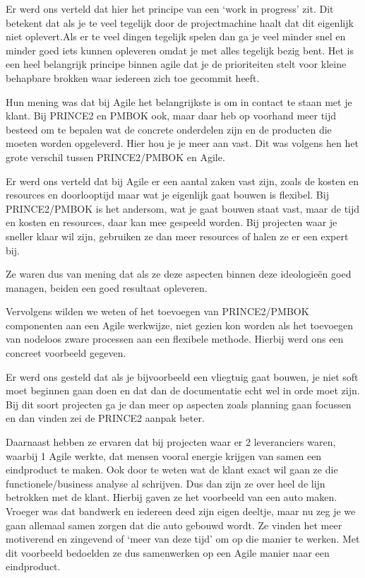 \documentclass[dutch]{hogent-article}
\begin{document}
Er werd ons verteld dat hier het principe van een ‘work in progress’ zit. Dit betekent dat als je te veel tegelijk door de projectmachine haalt dat dit eigenlijk niet oplevert.Als er te veel dingen tegelijk spelen dan ga je veel minder snel en minder goed iets kunnen opleveren omdat je met alles tegelijk bezig bent. Het is een heel belangrijk principe binnen agile dat je de prioriteiten stelt voor kleine behapbare brokken waar iedereen zich toe gecommit heeft. 
\newline

Hun mening was dat bij Agile het belangrijkste is om in contact te  staan met je klant. Bij PRINCE2 en PMBOK ook, maar daar heb op voorhand meer tijd besteed om te bepalen wat de concrete onderdelen zijn en de producten die moeten worden opgeleverd. Hier hou je je meer aan vast. Dit was volgens hen het grote verschil tussen PRINCE2/PMBOK en Agile. 
\newline

Er werd ons verteld dat bij Agile er een aantal zaken vast zijn, zoals de kosten en resources en doorlooptijd maar wat je eigenlijk gaat bouwen is flexibel. Bij PRINCE2/PMBOK is het andersom, wat je gaat bouwen staat vast, maar de tijd en kosten en resources, daar kan mee gespeeld worden. Bij projecten waar je sneller klaar wil zijn, gebruiken ze dan meer resources of halen ze er een expert bij.
\newline

Ze waren dus van mening dat als ze deze aspecten binnen deze ideologieën goed managen, beiden een goed resultaat opleveren. 
\newline

Vervolgens wilden we weten of het toevoegen van PRINCE2/PMBOK componenten aan een Agile werkwijze, niet gezien kon worden als het toevoegen van nodeloos zware processen aan een flexibele methode.  Hierbij werd ons een concreet voorbeeld gegeven. 
\newline

Er werd ons gesteld dat als je bijvoorbeeld een vliegtuig gaat bouwen, je niet soft moet beginnen gaan doen en dat dan de documentatie echt wel in orde moet zijn. Bij dit soort projecten ga je dan meer op aspecten zoals planning gaan focussen en dan vinden zei de PRINCE2 aanpak beter. 
\newline

Daarnaast hebben ze ervaren dat bij projecten waar er 2 leveranciers waren, waarbij 1 Agile werkte, dat mensen vooral energie krijgen van samen een eindproduct te maken. Ook door te weten wat de klant exact wil gaan ze die functionele/business analyse al schrijven. Dus dan zijn ze over heel de lijn betrokken met de klant. Hierbij gaven ze het voorbeeld van een auto maken. Vroeger was dat bandwerk en iedereen deed zijn eigen deeltje, maar nu zeg je we gaan allemaal samen zorgen dat die auto gebouwd wordt. Ze vinden het meer motiverend en zingevend of ‘meer van deze tijd’ om op die manier te werken. Met dit voorbeeld bedoelden ze dus samenwerken op een Agile manier naar een eindproduct. 
\newline
\end{document}
